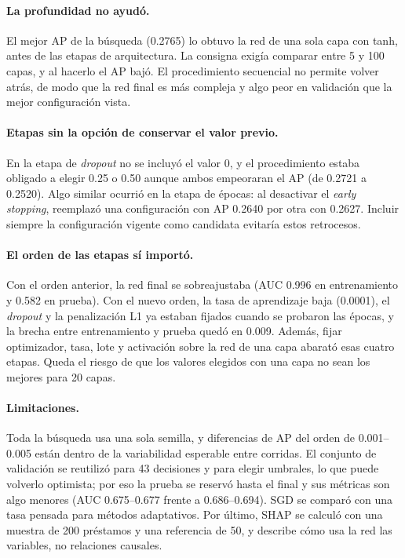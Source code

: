 \documentclass[12pt,a4paper]{article}
\begin{document}
\paragraph{La profundidad no ayudó.} El mejor AP de la búsqueda (0.2765) lo obtuvo la red de una sola capa con tanh, antes de las etapas de arquitectura. La consigna exigía comparar entre 5 y 100 capas, y al hacerlo el AP bajó. El procedimiento secuencial no permite volver atrás, de modo que la red final es más compleja y algo peor en validación que la mejor configuración vista.

\paragraph{Etapas sin la opción de conservar el valor previo.} En la etapa de \textit{dropout} no se incluyó el valor 0, y el procedimiento estaba obligado a elegir 0.25 o 0.50 aunque ambos empeoraran el AP (de 0.2721 a 0.2520). Algo similar ocurrió en la etapa de épocas: al desactivar el \textit{early stopping}, reemplazó una configuración con AP 0.2640 por otra con 0.2627. Incluir siempre la configuración vigente como candidata evitaría estos retrocesos.

\paragraph{El orden de las etapas sí importó.} Con el orden anterior, la red final se sobreajustaba (AUC 0.996 en entrenamiento y 0.582 en prueba). Con el nuevo orden, la tasa de aprendizaje baja (0.0001), el \textit{dropout} y la penalización L1 ya estaban fijados cuando se probaron las épocas, y la brecha entre entrenamiento y prueba quedó en 0.009. Además, fijar optimizador, tasa, lote y activación sobre la red de una capa abarató esas cuatro etapas. Queda el riesgo de que los valores elegidos con una capa no sean los mejores para 20 capas.

\paragraph{Limitaciones.} Toda la búsqueda usa una sola semilla, y diferencias de AP del orden de 0.001--0.005 están dentro de la variabilidad esperable entre corridas. El conjunto de validación se reutilizó para 43 decisiones y para elegir umbrales, lo que puede volverlo optimista; por eso la prueba se reservó hasta el final y sus métricas son algo menores (AUC 0.675--0.677 frente a 0.686--0.694). SGD se comparó con una tasa pensada para métodos adaptativos. Por último, SHAP se calculó con una muestra de 200 préstamos y una referencia de 50, y describe cómo usa la red las variables, no relaciones causales.
\end{document}
